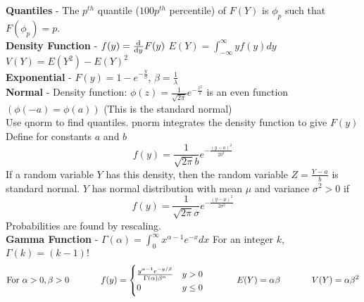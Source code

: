 \documentclass{scrartcl}
\begin{document}
\textbf{Quantiles} - The $p^{th}$ quantile ($100p^{th}$ percentile) of $F(Y)$ is $\phi_p$ such that $F(\phi_p)=p$.\\

\textbf{Density Function} - $f(y) = \od{}{y}F(y)$ \hspace{0.5in} $E(Y) = \int_{-\infty}^{\infty}yf(y)dy$ \hspace{0.5in} $V(Y) = E(Y^2) - E(Y)^2$\\

\textbf{Exponential} - $F(y) = 1 - e^{-\frac{y}{\beta}}$, $\beta = \frac{1}{\lambda}$\\

\textbf{Normal} - Density function: $\phi(z) = \frac{1}{\sqrt{2\pi}}e^{-\frac{z^2}{2}}$ is an even function $\left(\phi(-a)=\phi(a)\right)$ (This is the standard normal)\\
Use qnorm to find quantiles. pnorm integrates the density function to give $F(y)$
Define for constants $a$ and $b$ $$f(y) = \frac{1}{\sqrt{2\pi}b}e^{-\frac{(y-a)^2}{2b^2}}$$ If a random variable $Y$ has this density, then the random variable $Z=\frac{Y-a}{b}$ is standard normal.
$Y$ has normal distribution with mean $\mu$ and variance $\sigma^2>0$ if $$f(y) = \frac{1}{\sqrt{2\pi}\sigma}e^{-\frac{(y-\mu)^2}{2\sigma^2}}$$ Probabilities are found by rescaling.\\

\textbf{Gamma Function} - $\Gamma(\alpha) = \int_0^\infty x^{\alpha-1}e^{-x}dx$ \hspace{0.5in} For an integer $k$, $\Gamma(k) = (k-1)!$
$$\text{For } \alpha>0, \beta>0 \text{\hspace{0.5in}} f(y) = \begin{cases} \frac{y^{\alpha-1}e^{-y/\beta}}{\Gamma(\alpha)\beta^\alpha} & y>0\\ 0 & y \le 0 \end{cases} \text{\hspace{0.5in}} E(Y) = \alpha\beta \text{\hspace{0.5in}} V(Y) = \alpha\beta^2$$
\end{document}
